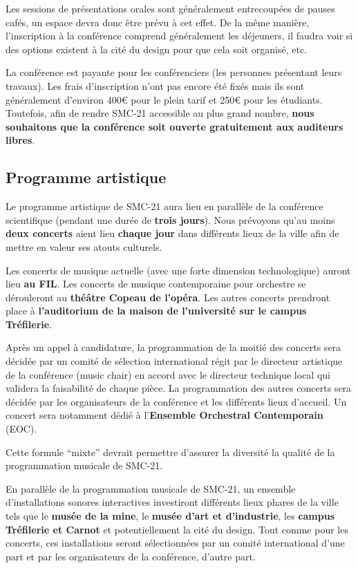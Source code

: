 \documentclass[fontsize=12pt]{scrartcl} %
\numberwithin{equation}{section} %
\numberwithin{figure}{section} %
\numberwithin{table}{section} %
\begin{document}
Les sessions de présentations orales sont généralement entrecoupées de pauses cafés, un espace devra donc être prévu à cet effet. De la même manière, l'inscription à la conférence comprend généralement les déjeuners, il faudra voir si des options existent à la cité du design pour que cela soit organisé, etc.

La conférence est payante pour les conférenciers (les personnes présentant leurs travaux). Les frais d'inscription n'ont pas encore été fixés mais ils sont généralement d'environ 400\euro{} pour le plein tarif et 250\euro{} pour les étudiants. Toutefois, afin de rendre SMC-21 accessible au plus grand nombre, \textbf{nous souhaitons que la conférence soit ouverte gratuitement aux auditeurs libres}. 

\subsection{Programme artistique}

Le programme artistique de SMC-21 aura lieu en parallèle de la conférence scientifique (pendant une durée de \textbf{trois jours}). Nous prévoyons qu'au moins \textbf{deux concerts} aient lieu \textbf{chaque jour} dans différents lieux de la ville afin de mettre en valeur ses atouts culturels. 

Les concerts de musique actuelle (avec une forte dimension technologique) auront lieu \textbf{au FIL}. Les concerts de musique contemporaine pour orchestre se dérouleront au \textbf{théâtre Copeau de l'opéra}. Les autres concerts prendront place à \textbf{l'auditorium de la maison de l'université sur le campus Tréfilerie}.

Après un appel à candidature, la programmation de la moitié des concerts sera décidée par un comité de sélection international régit par le directeur artistique de la conférence (music chair) en accord avec le directeur technique local qui validera la faisabilité de chaque pièce. La programmation des autres concerts sera décidée par les organisateurs de la conférence et les différents lieux d'accueil. Un concert sera notamment dédié à l'\textbf{Ensemble Orchestral Contemporain} (EOC). 

Cette formule ``mixte'' devrait permettre d'assurer la diversité la qualité de la programmation musicale de SMC-21.

En parallèle de la programmation musicale de SMC-21, un ensemble d'installations sonores interactives investiront différents lieux phares de la ville tels que le \textbf{musée de la mine}, le \textbf{musée d'art et d'industrie}, les \textbf{campus Tréfilerie et Carnot} et potentiellement la cité du design. Tout comme pour les concerts, ces installations seront sélectionnées par un comité international d'une part et par les organisateurs de la conférence, d'autre part.
\end{document}

